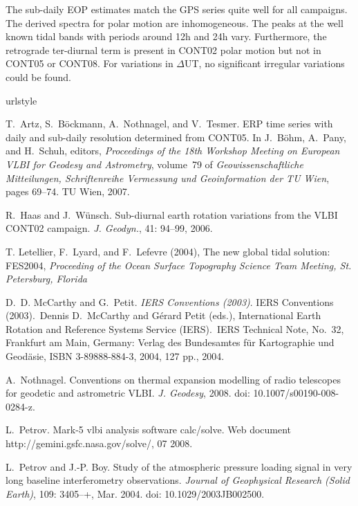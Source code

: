 \documentclass[natbib,twocolumn,twoside]{svmultiag}
\begin{document}
The sub-daily EOP estimates match the GPS series quite well for all campaigns.
The derived spectra for polar motion are inhomogeneous.
The peaks at the well known tidal bands with periods around 12h and 24h vary.
Furthermore, the retrograde ter-diurnal term is present in CONT02 polar motion
but not in CONT05 or CONT08.
For variations in $\Delta$UT, no significant irregular variations could be 
found.

\begin{thebibliography}{7}
\providecommand{\natexlab}[1]{#1}
\providecommand{\url}[1]{\texttt{#1}}
\expandafter\ifx\csname urlstyle\endcsname\relax
  \providecommand{\doi}[1]{doi: #1}\else
  \providecommand{\doi}{doi: \begingroup \urlstyle{rm}\Url}\fi

T.~Artz, S.~B{\"o}ckmann, A.~Nothnagel, and V.~Tesmer.
\newblock ERP time series with daily and sub-daily resolution determined from
  CONT05.
\newblock In J.~B{\"o}hm, A.~Pany, and H.~Schuh, editors, \emph{Proceedings of
  the 18th Workshop Meeting on European VLBI for Geodesy and Astrometry},
  volume~79 of \emph{Geowissenschaftliche Mitteilungen, Schriftenreihe
  Vermessung und Geoinformation der TU Wien}, pages 69--74. TU Wien, 2007.

R.~Haas and J.~W{\"u}nsch.
\newblock Sub-diurnal earth rotation variations from the VLBI CONT02 campaign.
\newblock \emph{J. Geodyn.}, 41: 94--99, 2006.

T. {Letellier}, F.~{Lyard}, and F.~{Lefevre} (2004), {The new global tidal solution: FES2004}, 
\textit{Proceeding of the Ocean Surface Topography Science Team Meeting, St. Petersburg, Florida} 

D.~D. {McCarthy} and G.~{Petit}.
\newblock \emph{IERS Conventions (2003)}.
\newblock IERS Conventions (2003).~Dennis D.~McCarthy and G{\'e}rard Petit
  (eds.), International Earth Rotation and Reference Systems Service
  (IERS).~IERS Technical Note, No.~32, Frankfurt am Main, Germany: Verlag des
  Bundesamtes f{\"u}r Kartographie und Geod{\"a}sie, ISBN 3-89888-884-3, 2004,
  127 pp.,  2004.

A.~Nothnagel.
\newblock Conventions on thermal expansion modelling of radio telescopes for
  geodetic and astrometric VLBI.
\newblock \emph{J. Geodesy}, 2008.
\newblock \doi{10.1007/s00190-008-0284-z}.

L.~Petrov.
\newblock Mark-5 vlbi analysis software calc/solve.
\newblock Web document http://gemini.gsfc.nasa.gov/solve/, 07 2008.

L.~{Petrov} and J.-P. {Boy}.
\newblock Study of the atmospheric pressure loading signal in very long
  baseline interferometry observations.
\newblock \emph{Journal of Geophysical Research (Solid Earth)}, 109:
  3405--+, Mar. 2004.
\newblock \doi{10.1029/2003JB002500}.

\end{thebibliography}
\end{document}
